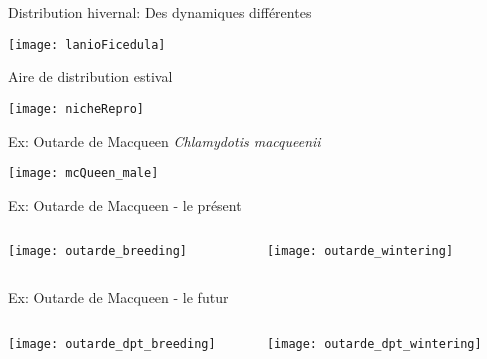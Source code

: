 \documentclass[]{beamer}
\begin{document}
\begin{frame}{Distribution hivernal: Des dynamiques différentes}
  \begin{center}
    \texttt{[image: lanioFicedula]}
  \end{center}
\end{frame}

\begin{frame}{Aire de distribution estival}
  \begin{center}
    \texttt{[image: nicheRepro]}
  \end{center}
\end{frame}


\begin{frame}{Ex: Outarde de Macqueen \textit{Chlamydotis macqueenii}}
  \begin{center}
    \texttt{[image: mcQueen\_male]}
  \end{center}
\end{frame}

\begin{frame}{Ex: Outarde de Macqueen - le présent}
  \begin{columns}
    \begin{column}[c]{0.5\textwidth}
      \texttt{[image: outarde\_breeding]}
    \end{column}
    \begin{column}[l]{0.5\textwidth}
      \begin{center}
        \texttt{[image: outarde\_wintering]} 
      \end{center}
    \end{column}
  \end{columns}
\end{frame}
\begin{frame}{Ex: Outarde de Macqueen - le futur}
  \begin{columns}
    \begin{column}[c]{0.5\textwidth}
      \texttt{[image: outarde\_dpt\_breeding]}
    \end{column}
    \begin{column}[l]{0.5\textwidth}
      \begin{center}
        \texttt{[image: outarde\_dpt\_wintering]} 
      \end{center}
    \end{column}
  \end{columns}
\end{frame}
\end{document}
